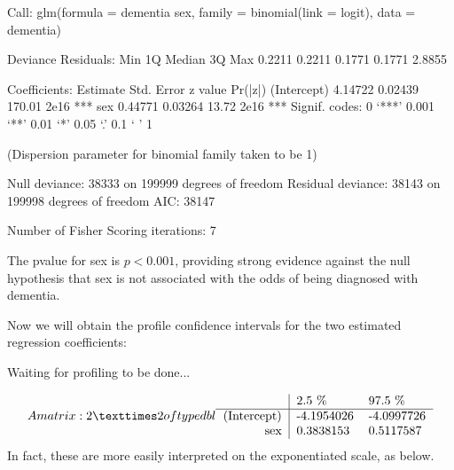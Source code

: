 \documentclass[letterpaper,10pt,english]{jupyterBook}
\begin{document}
\begin{sphinxVerbatim}[commandchars=\\\{\}]
Call:
glm(formula = dementia \PYGZti{} sex, family = binomial(link = \PYGZdq{}logit\PYGZdq{}), 
    data = dementia)

Deviance Residuals: 
    Min       1Q   Median       3Q      Max  
\PYGZhy{}0.2211  \PYGZhy{}0.2211  \PYGZhy{}0.1771  \PYGZhy{}0.1771   2.8855  

Coefficients:
            Estimate Std. Error z value Pr(\PYGZgt{}|z|)    
(Intercept) \PYGZhy{}4.14722    0.02439 \PYGZhy{}170.01   \PYGZlt{}2e\PYGZhy{}16 ***
sex          0.44771    0.03264   13.72   \PYGZlt{}2e\PYGZhy{}16 ***
\PYGZhy{}\PYGZhy{}\PYGZhy{}
Signif. codes:  0 ‘***’ 0.001 ‘**’ 0.01 ‘*’ 0.05 ‘.’ 0.1 ‘ ’ 1

(Dispersion parameter for binomial family taken to be 1)

    Null deviance: 38333  on 199999  degrees of freedom
Residual deviance: 38143  on 199998  degrees of freedom
AIC: 38147

Number of Fisher Scoring iterations: 7
\end{sphinxVerbatim}

\sphinxAtStartPar
The p\sphinxhyphen{}value for sex is \(p<0.001\), providing strong evidence against the null hypothesis that sex is not associated with the odds of being diagnosed with dementia.

\sphinxAtStartPar
Now we will obtain the profile confidence intervals for the two estimated regression coefficients:

\begin{sphinxVerbatim}[commandchars=\\\{\}]
\end{sphinxVerbatim}

\begin{sphinxVerbatim}[commandchars=\\\{\}]
Waiting for profiling to be done...
\end{sphinxVerbatim}
\begin{equation*}
\begin{split}A matrix: 2 × 2 of type dbl
\begin{tabular}{r|ll}
  & 2.5 \% & 97.5 \%\\
\hline
	(Intercept) & -4.1954026 & -4.0997726\\
	sex &  0.3838153 &  0.5117587\\
\end{tabular}\end{split}
\end{equation*}
\sphinxAtStartPar
In fact, these are more easily interpreted on the exponentiated scale, as below.
\end{document}
